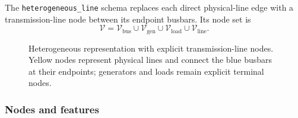 The \texttt{heterogeneous\_line} schema replaces each direct physical-line edge
with a transmission-line node between its endpoint busbars. Its node set is
\begin{equation}
  \mathcal{V} =
  \mathcal{V}_{\mathrm{bus}}
  \cup \mathcal{V}_{\mathrm{gen}}
  \cup \mathcal{V}_{\mathrm{load}}
  \cup \mathcal{V}_{\mathrm{line}}.
  \label{eq:heterogeneous-line-node-set}
\end{equation}

\begin{figure}[htbp]
  \centering
  \resizebox{0.92\linewidth}{!}{}
  \caption{Heterogeneous representation with explicit transmission-line nodes.
  Yellow nodes represent physical lines and connect the blue busbars at their
  endpoints; generators and loads remain explicit terminal nodes.}
  \label{fig:heterogeneous-line-node-graph}
\end{figure}

\subsubsection{Nodes and features}
\label{subsec:heterogeneous-line-nodes}

